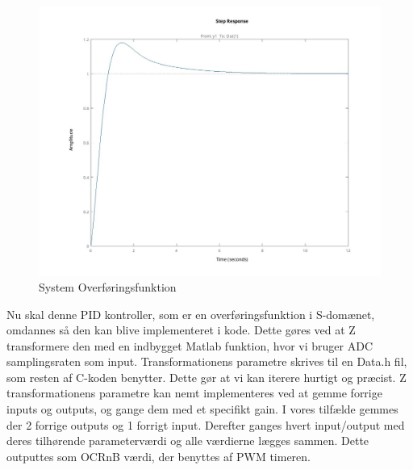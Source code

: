 \documentclass[../main.tex]{subfiles}
\begin{document}
\begin{figure}[H]
      \includegraphics[width=\textwidth]{Dokumentation/Figures/Motor PID Step Response.jpg}
     \caption{System Overføringsfunktion}
     \label{fig: System Overføringsfunktion}
     \end{figure}

Nu skal denne PID kontroller, som er en overføringsfunktion i S-domænet, omdannes så den kan blive implementeret i kode. Dette gøres ved at Z transformere den med en indbygget Matlab funktion, hvor vi bruger ADC samplingsraten som input. Transformationens parametre skrives til en Data.h fil, som resten af C-koden benytter. Dette gør at vi kan iterere hurtigt og præcist. Z transformationens parametre kan nemt implementeres ved at gemme forrige inputs og outputs, og gange dem med et specifikt gain. I vores tilfælde gemmes der 2 forrige outputs og 1 forrigt input. Derefter ganges hvert input/output med deres tilhørende parameterværdi og alle værdierne lægges sammen. Dette outputtes som OCRnB værdi, der benyttes af PWM timeren.
\end{document}
